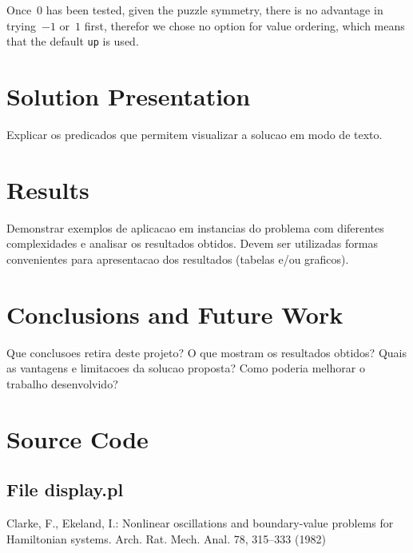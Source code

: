 \documentclass{llncs}
\begin{document}
Once~$0$ has been tested, given the puzzle symmetry, there is no advantage in trying~$-1$ or~$1$ first, therefor we chose no option for value ordering, which means that the default \verb|up| is used.

\section{Solution Presentation} 

Explicar os predicados que permitem visualizar a solucao em modo de texto.

\section{Results} 

Demonstrar exemplos de aplicacao em instancias do problema com diferentes complexidades e analisar os resultados obtidos. Devem ser utilizadas formas convenientes para apresentacao dos resultados (tabelas e/ou graficos).

\section{Conclusions and Future Work} 

Que conclusoes retira deste projeto? O que mostram os resultados obtidos? Quais as vantagens e limitacoes da solucao proposta? Como poderia melhorar o trabalho desenvolvido?

\appendix
\section{Source Code}
\subsection{File display.pl}



\begin{thebibliography}{}

Clarke, F., Ekeland, I.:
Nonlinear oscillations and boundary-value problems for
Hamiltonian systems.
Arch. Rat. Mech. Anal. 78, 315--333 (1982)

\end{thebibliography}

\bibauthoryear
\end{document}
